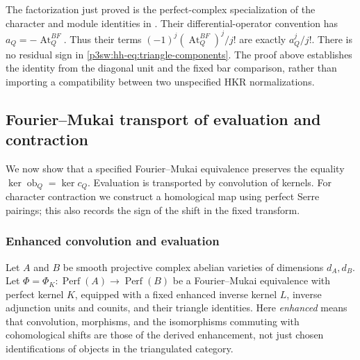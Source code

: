 \documentclass[11pt]{article}
\numberwithin{equation}{section}
\begin{document}
The factorization just proved is the perfect-complex specialization
of the character and module identities in
\cite[Proposition~6.2.1, Corollary~6.3.2, and
Proposition~6.4.4]{P3HHBF}.  Their differential-operator convention
has \(a_Q=-\operatorname{At}^{BF}_Q\).  Thus their terms
\((-1)^j(\operatorname{At}^{BF}_Q)^j/j!\) are exactly \(a_Q^j/j!\).
There is no residual sign in
\eqref{p3sw:hh-eq:triangle-components}.  The proof above establishes
the identity from the diagonal unit and the fixed bar comparison,
rather than importing a compatibility between two unspecified HKR
normalizations.

\subsection{Fourier--Mukai transport of evaluation and contraction}
\label{p3sw:hh-fourier-mukai}

We now show that a specified Fourier--Mukai equivalence preserves
the equality \(\ker\operatorname{ob}_Q=\ker c_Q\).  Evaluation is
transported by convolution of kernels.  For character contraction we
construct a homological map using perfect Serre pairings; this also
records the sign of the shift in the fixed transform.

\subsubsection{Enhanced convolution and evaluation}

Let \(A\) and \(B\) be smooth projective complex abelian varieties
of dimensions \(d_A,d_B\).  Let
\(\Phi=\Phi_K:\operatorname{Perf}(A)\to\operatorname{Perf}(B)\)
be a Fourier--Mukai equivalence with perfect kernel \(K\), equipped
with a fixed enhanced inverse kernel \(L\), inverse adjunction units
and counits, and their triangle identities.  Here \emph{enhanced}
means that convolution, morphisms, and the isomorphisms commuting
with cohomological shifts are those of the derived enhancement, not
just chosen identifications of objects in the triangulated category.
\end{document}
